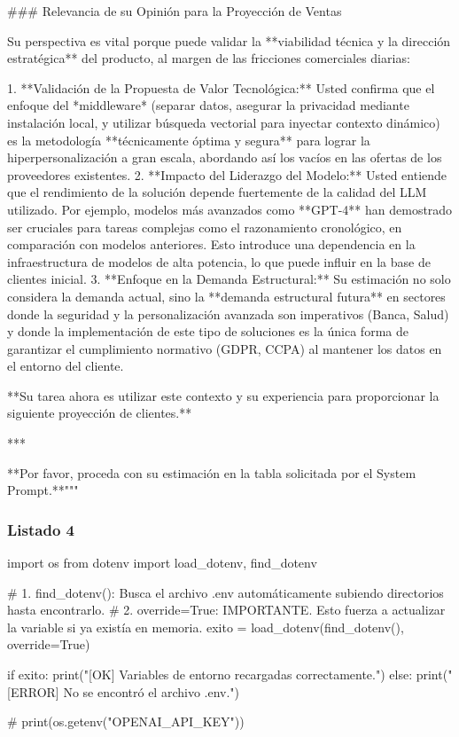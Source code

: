 \begin{APACode}
### Relevancia de su Opinión para la Proyección de Ventas

Su perspectiva es vital porque puede validar la **viabilidad técnica y la dirección estratégica** del producto, al margen de las fricciones comerciales diarias:

1.  **Validación de la Propuesta de Valor Tecnológica:** Usted confirma que el enfoque del *middleware* (separar datos, asegurar la privacidad mediante instalación local, y utilizar búsqueda vectorial para inyectar contexto dinámico) es la metodología **técnicamente óptima y segura** para lograr la hiperpersonalización a gran escala, abordando así los vacíos en las ofertas de los proveedores existentes.
2.  **Impacto del Liderazgo del Modelo:** Usted entiende que el rendimiento de la solución depende fuertemente de la calidad del LLM utilizado. Por ejemplo, modelos más avanzados como **GPT-4** han demostrado ser cruciales para tareas complejas como el razonamiento cronológico, en comparación con modelos anteriores. Esto introduce una dependencia en la infraestructura de modelos de alta potencia, lo que puede influir en la base de clientes inicial.
3.  **Enfoque en la Demanda Estructural:** Su estimación no solo considera la demanda actual, sino la **demanda estructural futura** en sectores donde la seguridad y la personalización avanzada son imperativos (Banca, Salud) y donde la implementación de este tipo de soluciones es la única forma de garantizar el cumplimiento normativo (GDPR, CCPA) al mantener los datos en el entorno del cliente.

**Su tarea ahora es utilizar este contexto y su experiencia para proporcionar la siguiente proyección de clientes.**

***

**Por favor, proceda con su estimación en la tabla solicitada por el System Prompt.**"""
\end{APACode}

\subsubsection{Listado 4}
\label{anexo:code-6-3-1-1-4}

\begin{APACode}
import os
from dotenv import load_dotenv, find_dotenv

# 1. find_dotenv(): Busca el archivo .env automáticamente subiendo directorios hasta encontrarlo.
# 2. override=True: IMPORTANTE. Esto fuerza a actualizar la variable si ya existía en memoria.
exito = load_dotenv(find_dotenv(), override=True)

if exito:
    print("[OK] Variables de entorno recargadas correctamente.")
else:
    print("[ERROR] No se encontró el archivo .env.")

# print(os.getenv("OPENAI_API_KEY"))
\end{APACode}

